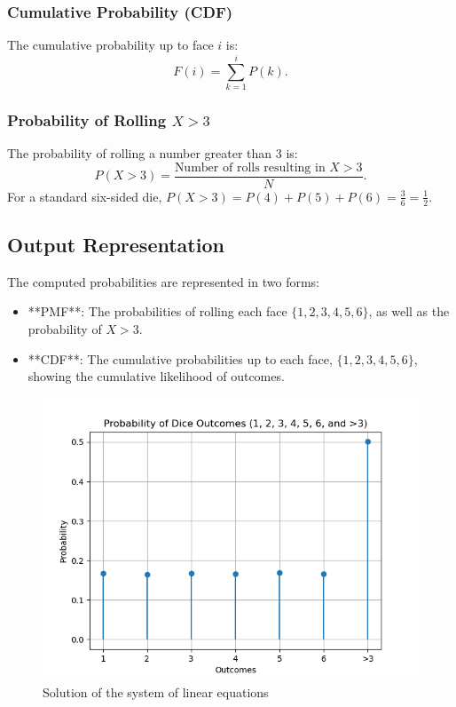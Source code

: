 \documentclass[journal]{IEEEtran}
\begin{document}
\subsubsection*{Cumulative Probability (CDF)}
The cumulative probability up to face \( i \) is:
\[
F(i) = \sum_{k=1}^{i} P(k).
\]

\subsubsection*{Probability of Rolling \( X > 3 \)}
The probability of rolling a number greater than 3 is:
\[
P(X > 3) = \frac{\text{Number of rolls resulting in } X > 3}{N}.
\]
For a standard six-sided die, \( P(X > 3) = P(4) + P(5) + P(6) = \frac{3}{6} = \frac{1}{2} \).

\subsection*{Output Representation}
The computed probabilities are represented in two forms:
\begin{itemize}
    \item **PMF**: The probabilities of rolling each face \( \{1, 2, 3, 4, 5, 6\} \), as well as the probability of \( X > 3 \).
    \item **CDF**: The cumulative probabilities up to each face, \( \{1, 2, 3, 4, 5, 6\} \), showing the cumulative likelihood of outcomes.
\end{itemize}
	\begin{figure}[h!]
		\centering
		\includegraphics[width=\columnwidth]{figs/Figure_1.png}
		\caption{Solution of the system of linear equations}
		\label{stemplot}
	\end{figure}
\end{document}

